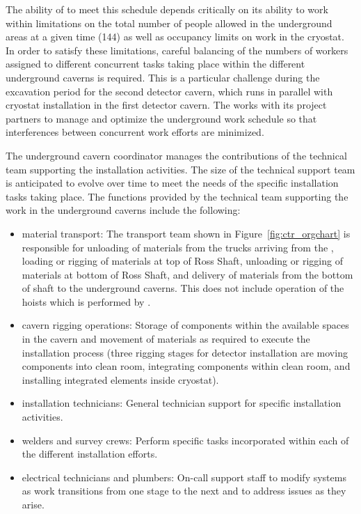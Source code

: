 The ability of  to meet this schedule depends
critically on its ability to work within limitations on the total
number of people allowed in the underground areas at a given time
(144) as well as occupancy limits on work in the cryostat.  In order
to satisfy these limitations, careful balancing of the numbers of
workers assigned to different concurrent tasks taking place within the
different underground caverns is required.  This is a particular
challenge during the excavation period for the second detector cavern,
which runs in parallel with cryostat installation in the first
detector cavern.  The  works with its  project 
partners to manage and optimize the underground work schedule so that 
interferences between concurrent work efforts are minimized.

The underground cavern coordinator manages the contributions of 
the technical team supporting the installation activities.
The size of the technical support team is anticipated to evolve  
over time to meet the needs of the specific installation tasks 
taking place.  The functions provided by the technical team 
supporting the work in the underground caverns include the
following:
\begin{itemize}
  \item {material transport:} The transport team shown in
    Figure~\ref{fig:ctr_orgchart} is responsible for unloading of
    materials from the trucks arriving from the , loading
    or rigging of materials at top of Ross Shaft, unloading or rigging
    of materials at bottom of Ross Shaft, and delivery of materials
    from the bottom of shaft to the underground caverns. This does not
    include operation of the hoists which is performed by
    .
  \item {cavern rigging operations:}  Storage of 
        components within the available spaces 
        in the cavern and movement of materials as required to 
        execute the installation process (three rigging stages
        for detector installation are moving components into 
        clean room, integrating components within clean room, 
        and installing integrated elements inside cryostat).
  \item {installation technicians:}  General technician 
        support for specific installation activities. 
  \item {welders and survey crews:}  Perform 
        specific tasks incorporated within each of the different 
        installation efforts.
  \item {electrical technicians and plumbers:} On-call support staff
    to modify systems as work transitions from one stage to the next
    and to address issues as they arise.
\end{itemize}   
    

